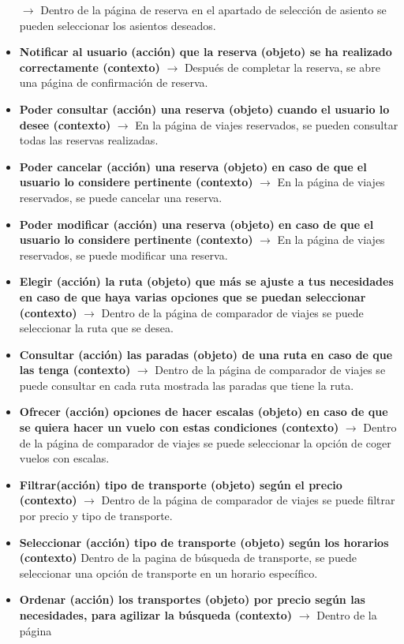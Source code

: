 \begin{itemize}
    $\rightarrow$ Dentro de la página de reserva en el apartado de selección de asiento se pueden seleccionar los asientos deseados.
    \item \textbf{Notificar al usuario (acción) que la reserva (objeto) se ha realizado correctamente (contexto)} $\rightarrow$ Después de completar la reserva, 
    se abre una página de confirmación de reserva.
    \item \textbf{Poder consultar (acción) una reserva (objeto) cuando el usuario lo desee (contexto)} $\rightarrow$ En la página de viajes reservados, se pueden
    consultar todas las reservas realizadas.
    \item \textbf{Poder cancelar (acción) una reserva (objeto) en caso de que el usuario lo considere pertinente (contexto)} $\rightarrow$ En la página de viajes 
    reservados, se puede cancelar una reserva.
    \item \textbf{Poder modificar (acción) una reserva (objeto) en caso de que el usuario lo considere pertinente (contexto)} $\rightarrow$ En la página de viajes 
    reservados, se puede modificar una reserva.
    \item \textbf{Elegir (acción) la ruta (objeto) que más se ajuste a tus necesidades en caso de que haya varias opciones que se puedan seleccionar (contexto)}
    $\rightarrow$ Dentro de la página de comparador de viajes se puede seleccionar la ruta que se desea.
    \item \textbf{Consultar (acción) las paradas (objeto) de una ruta en caso de que las tenga (contexto)} $\rightarrow$ Dentro de la página de comparador de viajes 
    se puede consultar en cada ruta mostrada las paradas que tiene la ruta.
    \item \textbf{Ofrecer (acción) opciones de hacer escalas (objeto) en caso de que se quiera hacer un vuelo con estas condiciones (contexto)} $\rightarrow$ Dentro 
    de la página de comparador de viajes se puede seleccionar la opción de coger vuelos con escalas.
    \item \textbf{Filtrar(acción) tipo de transporte (objeto) según el precio (contexto)} $\rightarrow$ Dentro de la página de comparador de viajes se puede filtrar 
    por precio y tipo de transporte.
    \item \textbf{Seleccionar (acción) tipo de transporte (objeto) según los horarios (contexto)} Dentro de la pagina de búsqueda de transporte, se puede seleccionar 
    una opción de transporte en un horario específico.
    \item \textbf{Ordenar (acción) los transportes (objeto) por precio según las necesidades, para agilizar la búsqueda (contexto)} $\rightarrow$ Dentro de la página 

\end{itemize}

